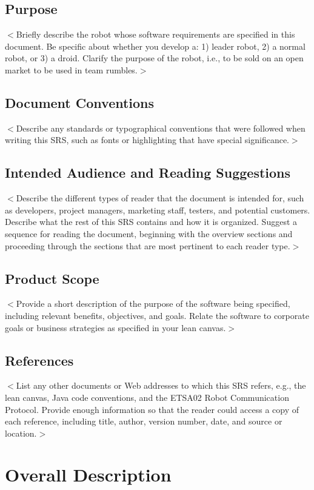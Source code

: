 \documentclass{scrreprt}
\begin{document}
\section{Purpose}
$<$Briefly describe the robot whose software requirements are specified in this document. Be specific about whether you develop a: 1) leader robot, 2) a normal robot, or 3) a droid. Clarify the purpose of the robot, i.e., to be sold on an open market to be used in team rumbles.$>$

\section{Document Conventions}
$<$Describe any standards or typographical conventions that were followed when writing this SRS, such as fonts or highlighting that have special significance.$>$

\section{Intended Audience and Reading Suggestions}
$<$Describe the different types of reader that the document is intended for, such as developers, project managers, marketing staff, testers, and potential customers. Describe what the rest of this SRS contains and how it is organized. Suggest a sequence for reading the document, beginning with the overview sections and proceeding through the sections that are most pertinent to each reader type.$>$

\section{Product Scope}
$<$Provide a short description of the purpose of the software being specified, including relevant benefits, objectives, and goals. Relate the software to corporate goals or business strategies as specified in your lean canvas.$>$

\section{References}
$<$List any other documents or Web addresses to which this SRS refers, e.g., the lean canvas, Java code conventions, and the ETSA02 Robot Communication Protocol. Provide enough information so that the reader could access a copy of each reference, including title, author, version number, date, and source or location.$>$

\chapter{Overall Description}
\end{document}
